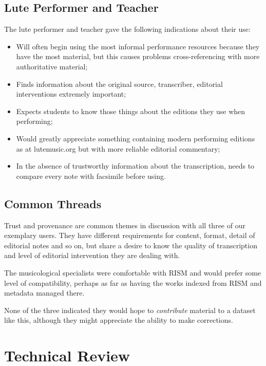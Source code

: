 \documentclass[twocolumn,10pt]{paper}
\begin{document}
\begin{sloppypar}
  \subsection{Lute Performer and Teacher}

  The lute performer and teacher gave the following indications about
  their use:

  \begin{itemize}
    \item Will often begin using the most informal performance
      resources because they have the most material, but this causes
      problems cross-referencing with more authoritative material;
    \item Finds information about the original source, transcriber,
      editorial interventions extremely important;
    \item Expects students to know those things about the editions
      they use when performing;
    \item Would greatly appreciate something containing modern
      performing editions as at lutemusic.org but with more reliable
      editorial commentary;
    \item In the absence of trustworthy information about the
      transcription, needs to compare every note with facsimile before
      using.
  \end{itemize}

  \subsection{Common Threads}

  Trust and provenance are common themes in discussion with all three
  of our exemplary users. They have different requirements for
  content, format, detail of editorial notes and so on, but share a
  desire to know the quality of transcription and level of editorial
  intervention they are dealing with.

  The musicological specialists were comfortable with RISM and would
  prefer some level of compatibility, perhaps as far as having the
  works indexed from RISM and metadata managed there.

  None of the three indicated they would hope to {\em contribute}
  material to a dataset like this, although they might appreciate the
  ability to make corrections.
  
  \section{Technical Review}


\end{sloppypar}
\end{document}
